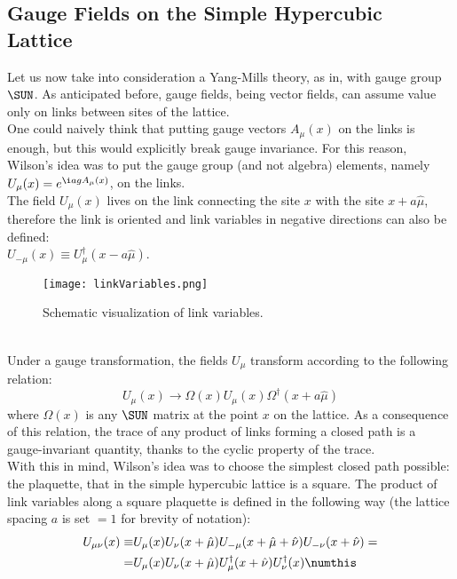 \subsection{Gauge Fields on the Simple Hypercubic Lattice}
Let us now take into consideration a Yang-Mills theory, as in, with gauge group $\SUN$.
As anticipated before, gauge fields, being vector fields, can assume value only on links between sites of the lattice.\\
One could naively think that putting gauge vectors $A_\mu(x)$ on the links is enough, but this would explicitly break gauge invariance.
For this reason, Wilson's idea was to put the gauge group (and not algebra) elements, namely $U_\mu(x) = e^{\i a g A_\mu(x)}$, on the links.\\
The field $U_\mu(x)$ lives on the link connecting the site $x$ with the site $x+a\hat\mu$, therefore the link is oriented and link variables in negative directions can also be defined:\\
$U_{-\mu}(x) \equiv U^\dagger_\mu(x-a\hat\mu)$.
\begin{figure}[!htbp]
    \texttt{[image: linkVariables.png]}
    \caption{Schematic visualization of link variables.}
    \label{1F:LinkVariables}
\end{figure}\\
Under a gauge transformation, the fields $U_\mu$ transform according to the following relation:
\begin{equation}
    U_\mu(x)\rightarrow \Omega(x) U_\mu(x) \Omega^\dagger(x+a\hat\mu) \label{1:GaugeTransformLinkVariable}
\end{equation}
where $\Omega(x)$ is any $\SUN$ matrix at the point $x$ on the lattice.
As a consequence of this relation, the trace of any product of links forming a closed path is a gauge-invariant quantity, thanks to the cyclic property of the trace.\\
With this in mind, Wilson's idea was to choose the simplest closed path possible: the plaquette, that in the simple hypercubic lattice is a square.
The product of link variables along a square plaquette is defined in the following way (the lattice spacing $a$ is set $=1$ for brevity of notation):
\begin{align*}
    U_{\mu\nu}(x) \equiv& U_\mu(x)U_\nu(x+\hat\mu)U_{-\mu}(x+\hat\mu+\hat\nu)U_{-\nu}(x+\hat\nu) =\\
    =& U_\mu(x)U_\nu(x+\hat\mu)U^\dagger_\mu(x+\hat\nu)U^\dagger_\nu(x) \numthis\label{1:Plaquette}
\end{align*}
